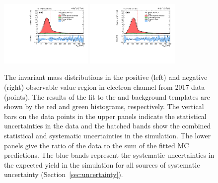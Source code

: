 \begin{figure}
    \includegraphics[width=0.4\textwidth]{figure/FitResult_17_el_lep_tmass_obs14_p_chi2_20.pdf}
    \includegraphics[width=0.4\textwidth]{figure/FitResult_17_el_lep_tmass_obs14_n_chi2_20.pdf}
    \caption[The \Mlb invariant mass distributions in electron channel from 2017 data.]
    {
        The \Mlb invariant mass distributions in the positive (left) and negative (right) observable value region in electron channel from 2017 data (points).
        The results of the fit to the \ttbar and background templates are shown by the red and green histograms, respectively.
        The vertical bars on the data points in the upper panels indicate the statistical uncertainties in the data and the hatched bands show the combined statistical and systematic uncertainties in the simulation.
        The lower panels give the ratio of the data to the sum of the fitted MC predictions.
        The blue bands represent the systematic uncertainties in the expected yield in the simulation for all sources of systematic uncertainty (Section~\ref{sec:uncertainty}).
    }
    \label{fig:fitting_results_17_el}
\end{figure}
